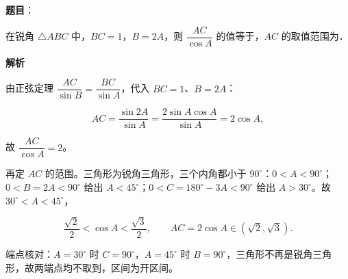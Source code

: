 \begin{answer}

\textbf{题目}：

在锐角 $\triangle ABC$ 中，$BC=1$，$B=2A$，则 $\dfrac{AC}{\cos A}$ 的值等于\gkblank{}，$AC$ 的取值范围为\gkblank{}．

\textbf{解析}

由正弦定理 $\dfrac{AC}{\sin B}=\dfrac{BC}{\sin A}$，代入 $BC=1$、$B=2A$：

\nopagebreak[4]
\[AC=\frac{\sin2A}{\sin A}=\frac{2\sin A\cos A}{\sin A}=2\cos A,\]

故 $\dfrac{AC}{\cos A}=2$。

再定 $AC$ 的范围。三角形为锐角三角形，三个内角都小于 $90^\circ$：$0<A<90^\circ$；$0<B=2A<90^\circ$ 给出 $A<45^\circ$；$0<C=180^\circ-3A<90^\circ$ 给出 $A>30^\circ$。故 $30^\circ<A<45^\circ$，

\nopagebreak[4]
\[\frac{\sqrt2}{2}<\cos A<\frac{\sqrt3}{2},\qquad AC=2\cos A\in(\sqrt2,\sqrt3).\]

端点核对：$A=30^\circ$ 时 $C=90^\circ$，$A=45^\circ$ 时 $B=90^\circ$，三角形不再是锐角三角形，故两端点均不取到，区间为开区间。


\end{answer}
